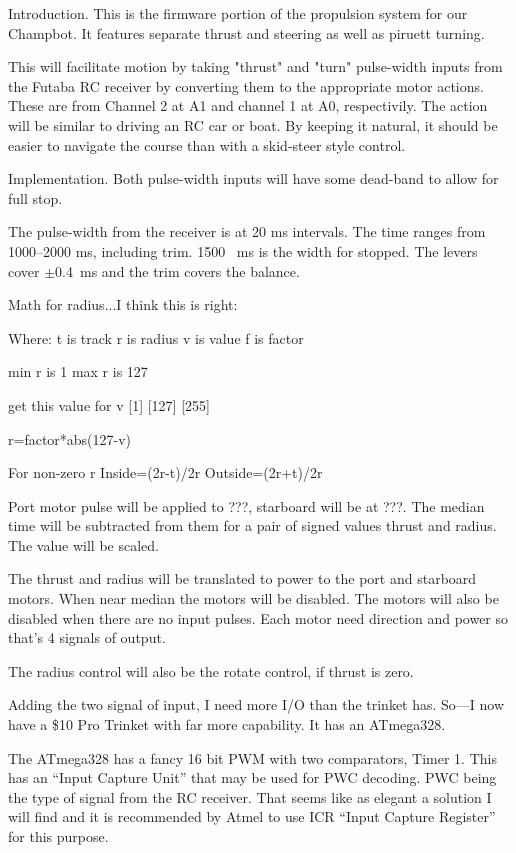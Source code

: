


\nocon %
\datethis %


Introduction. This is the firmware portion of the propulsion system for
our
Champbot.
It features separate thrust and steering as well as piruett turning.

This will facilitate motion by taking "thrust" and "turn" pulse-width inputs
from the Futaba RC receiver by converting them to the appropriate motor
actions.
These are from Channel 2 at A1 and channel 1 at A0, respectivily.
The action will be similar to driving an RC car or boat.
By keeping it natural, it should be easier to navigate the course than with a
skid-steer style control.

\fi

Implementation.
Both pulse-width inputs will have some dead-band to allow for full stop.

The pulse-width from the receiver is at 20 ms intervals.
The time ranges from 1000--2000 ms, including trim.
1500~ ms is the width for stopped.
The levers cover $\pm$0.4~ms and the trim covers the balance.

Math for radius...I think this is right:

Where:
t is track
r is radius
v is value
f is factor

min r is 1
max r is 127

get this value for v
[1]
[127]
[255]

r=factor*abs(127-v)


For non-zero r
Inside=(2r-t)/2r
Outside=(2r+t)/2r


Port motor pulse will be applied to ???, starboard will be at ???.
The median time will be subtracted from them for a pair of signed values
thrust and radius. The value will be scaled.

The thrust and radius will be translated to power to the
port and starboard motors. When near median the motors will be disabled.
The motors will also be disabled when there are no input pulses.
Each motor need direction and power so that's 4 signals of output.

The radius control will also be the rotate control, if thrust is zero.

Adding the two signal of input, I need more I/O than the trinket has.
So---I now have a \$10 Pro Trinket with far more capability.
It has an ATmega328.

The ATmega328 has a fancy 16 bit PWM with two comparators, Timer 1.
This has an ``Input Capture Unit'' that may be used for PWC decoding.
PWC being the type of signal from the RC receiver.
That seems like as elegant a solution I will find and it is recommended by
Atmel to use ICR ``Input Capture Register'' for this purpose.

